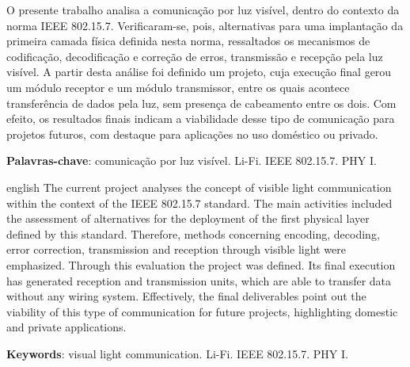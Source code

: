 
\setlength{\absparsep}{18pt} %
\begin{resumo}
	O presente trabalho analisa a comunicação por luz visível, dentro do contexto da norma IEEE 802.15.7. Verificaram-se, pois, alternativas para uma implantação da primeira camada física definida nesta norma, ressaltados os mecanismos de codificação, decodificação e correção de erros, transmissão e recepção pela luz visível. A partir desta análise foi definido um projeto, cuja execução final gerou um módulo receptor e um módulo transmissor, entre os quais acontece transferência de dados pela luz, sem presença de cabeamento entre os dois. Com efeito, os resultados finais indicam a viabilidade desse tipo de comunicação para projetos futuros, com destaque para aplicações no uso doméstico ou privado. 
	
	\vspace{\onelineskip}
	\noindent 
	\textbf{Palavras-chave}: comunicação por luz visível. Li-Fi. IEEE 802.15.7. PHY I.
\end{resumo}

\begin{resumo}[Abstract]
	\begin{otherlanguage*}{english}
		The current project analyses the concept of visible light communication within the context of the IEEE 802.15.7 standard. The main activities included the assessment of alternatives for the deployment of the first physical layer defined by this standard. Therefore, methods concerning encoding, decoding, error correction, transmission and reception through visible light were emphasized. Through this evaluation the project was defined. Its final execution has generated reception and transmission units, which are able to transfer data without any wiring system. Effectively, the final deliverables point out the viability of this type of communication for future projects, highlighting domestic and private applications.
		
		\vspace{\onelineskip}
		\noindent 
		\textbf{Keywords}: visual light communication. Li-Fi. IEEE 802.15.7. PHY I.
	\end{otherlanguage*}
\end{resumo}
